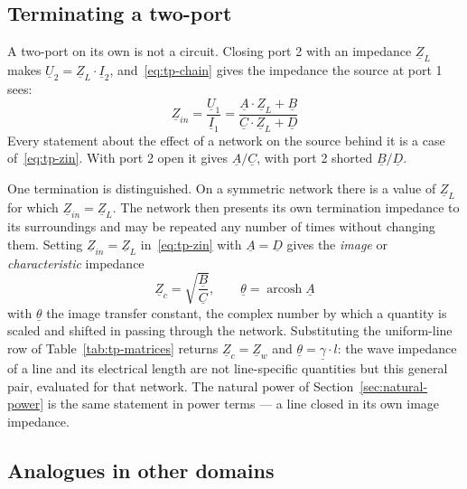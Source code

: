 \subsection{Terminating a two-port}
\label{sec:tp-terminated}

A two-port on its own is not a circuit. Closing port 2 with an impedance
$\underline{Z}_L$ makes $\underline{U}_2 = \underline{Z}_L \cdot
\underline{I}_2$, and~\eqref{eq:tp-chain} gives the impedance the source at
port 1 sees:
\begin{equation}
  \underline{Z}_{in}
    = \frac{\underline{U}_1}{\underline{I}_1}
    = \frac{\underline{A} \cdot \underline{Z}_L + \underline{B}}
           {\underline{C} \cdot \underline{Z}_L + \underline{D}}
  \label{eq:tp-zin}
\end{equation}
Every statement about the effect of a network on the source behind it is a
case of~\eqref{eq:tp-zin}. With port 2 open it gives
$\underline{A}/\underline{C}$, with port 2 shorted
$\underline{B}/\underline{D}$.

One termination is distinguished. On a symmetric network there is a value of
$\underline{Z}_L$ for which $\underline{Z}_{in} = \underline{Z}_L$. The
network then presents its own termination impedance to its surroundings and
may be repeated any number of times without changing them. Setting $\underline{Z}_{in} =
\underline{Z}_L$ in~\eqref{eq:tp-zin} with $\underline{A} = \underline{D}$
gives the \emph{image} or \emph{characteristic} impedance
\begin{equation}
  \underline{Z}_c = \sqrt{\frac{\underline{B}}{\underline{C}}},
  \qquad
  \underline{\theta} = \operatorname{arcosh} \underline{A}
  \label{eq:tp-image}
\end{equation}
with $\underline{\theta}$ the image transfer constant, the complex number by
which a quantity is scaled and shifted in passing through the network.
Substituting the uniform-line row of Table~\ref{tab:tp-matrices} returns
$\underline{Z}_c = \underline{Z}_w$ and $\underline{\theta} =
\underline{\gamma} \cdot l$: the wave impedance of a line and its electrical
length are not line-specific quantities but this general pair, evaluated for
that network. The natural power of Section~\ref{sec:natural-power} is the
same statement in power terms --- a line closed in its own image impedance.

\subsection{Analogues in other domains}
\label{sec:tp-domains}

